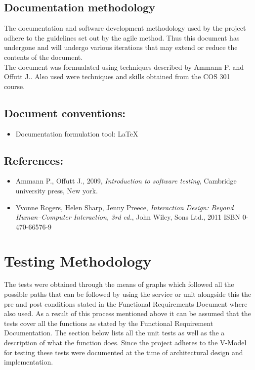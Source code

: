 \documentclass[12pt]{article}
\begin{document}
\vspace{0.2in}

\subsection{Documentation methodology}
\vspace{0.2in}
\begin{flushleft}
The documentation and software development methodology used by the project adhere to the guidelines set out by the agile method. Thus this document has undergone and will undergo various iterations that may extend or reduce the contents of the document.\\

The document was formualated using techniques described by Ammann P. and Offutt J.. Also used were techniques and skills obtained from the COS 301 course. 

\vspace{0.5in}

\subsection{Document conventions:}
\vspace{0.1in}
\begin{itemize}
\item Documentation formulation tool: LaTeX
\end{itemize}

\vspace{0.2in}
\subsection{References:}
\vspace{0.1in}
\begin{itemize}
\item Ammann P., Offutt J., 2009, \textit{Introduction to software testing}, Cambridge university press, New york.
\item Yvonne Rogers, Helen Sharp,  Jenny Preece,\textit{  Interaction Design: Beyond Human–Computer Interaction, 3rd ed.}, John Wiley, Sons Ltd., 2011 ISBN 0-470-66576-9
\end{itemize}	

\vspace{0.5in}


\newpage
\section{Testing Methodology}
The tests were obtained through the means of graphs which followed all the possible paths that can be followed by using the service or unit alongside this the pre and post conditions stated in the Functional Requirements Document where also used. As a result of this process mentioned above it can be assumed that the tests cover all the functions as stated by the Functional Requirement Documentation. The section below lists all the unit tests as well as the a description of what the function does. Since the project adheres to the V-Model for testing these tests were documented at the time of architectural design and implementation.



\end{flushleft}
\end{document}
